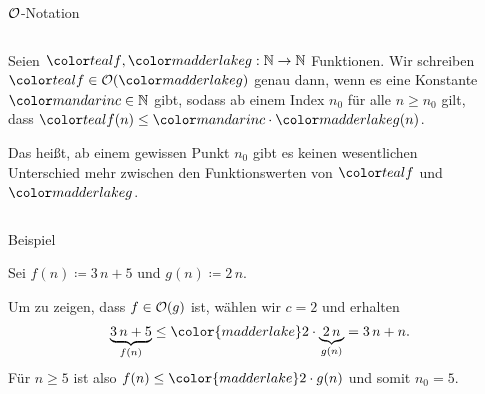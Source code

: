 \begin{frame}{$\mathcal{O}$-Notation}
\begin{columns}[T,onlytextwidth]
\begin{column}{0.47\textwidth}
    \begin{definition}
    Seien $\teal{f}, \red{g}: \nat \to \nat$ Funktionen.
    Wir schreiben $\teal{f} \in \bigO(\red{g})$ genau dann, wenn es eine Konstante $\orange{c} \in \nat$ gibt, sodass ab einem Index $n_0$ f\"ur alle $n \geq n_0$ gilt, dass $\teal{f}(n) \leq \orange{c} \cdot \red{g}(n)$.
    \end{definition}
    
    \medskip
    
    {\footnotesize Das hei{\ss}t, ab einem gewissen Punkt $n_0$ gibt es keinen \alert{wesentlichen} Unterschied mehr zwischen den Funktionswerten von $\teal{f}$ und $\red{g}$.}
\end{column}
\begin{column}{0.47\textwidth}
\end{column}
\end{columns}
\end{frame}

\begin{frame}{Beispiel}
\begin{beispiel}
Sei $f(n) \coloneqq 3 \, n + 5$ und $g(n) \coloneqq 2 \, n$.

Um zu zeigen, dass $f \in \mathcal{O}(g)$ ist, w\"ahlen wir {\color{madderlake} $c=2$} und erhalten 
\begin{equation*}
    \underbrace{3 \, n + 5}_{f(n)} \leq {\color{madderlake} 2} \cdot \underbrace{2 \, n}_{g(n)} = 3 \, n + n.
\end{equation*}
F\"ur $n \geq 5$ ist also $f(n) \leq {\color{madderlake} 2} \cdot g(n)$ und somit $n_0 = 5$.
\end{beispiel}
\end{frame}

